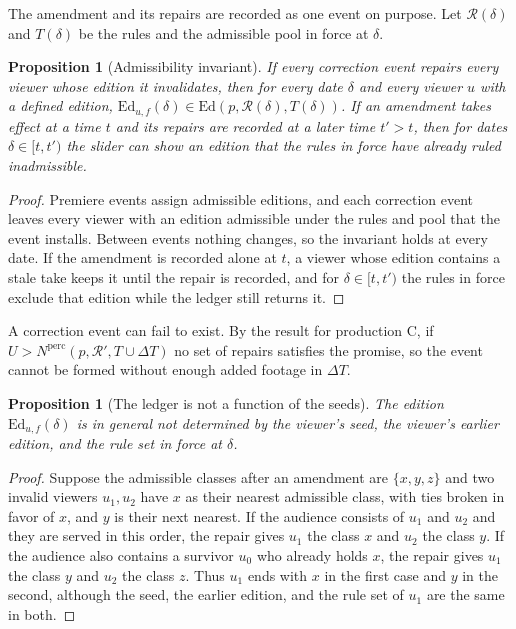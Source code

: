 \documentclass[11pt,twoside,openright]{book}
\theoremstyle{plain}
\newtheorem{proposition}[theorem]{Proposition}
\theoremstyle{definition}
\theoremstyle{remark}
\newcommand{\Ed}{\mathrm{Ed}}       %
\begin{document}
The amendment and its repairs are recorded as one event on purpose. Let $\mathcal R(\delta)$ and $T(\delta)$ be the rules and the admissible pool in force at $\delta$.

\begin{proposition}[Admissibility invariant]\label{prop:invariant}
If every correction event repairs every viewer whose edition it invalidates, then for every date $\delta$ and every viewer $u$ with a defined edition, $\mathrm{Ed}_{u,f}(\delta)\in\Ed(p,\mathcal R(\delta),T(\delta))$. If an amendment takes effect at a time $t$ and its repairs are recorded at a later time $t'>t$, then for dates $\delta\in[t,t')$ the slider can show an edition that the rules in force have already ruled inadmissible.
\end{proposition}

\begin{proof}
Premiere events assign admissible editions, and each correction event leaves every viewer with an edition admissible under the rules and pool that the event installs. Between events nothing changes, so the invariant holds at every date. If the amendment is recorded alone at $t$, a viewer whose edition contains a stale take keeps it until the repair is recorded, and for $\delta\in[t,t')$ the rules in force exclude that edition while the ledger still returns it.
\end{proof}

A correction event can fail to exist. By the result for production C, if $U>N^{\mathrm{perc}}(p,\mathcal R',T\cup\Delta T)$ no set of repairs satisfies the promise, so the event cannot be formed without enough added footage in $\Delta T$.

\begin{proposition}[The ledger is not a function of the seeds]\label{prop:ledger}
The edition $\mathrm{Ed}_{u,f}(\delta)$ is in general not determined by the viewer's seed, the viewer's earlier edition, and the rule set in force at $\delta$.
\end{proposition}

\begin{proof}
Suppose the admissible classes after an amendment are $\{x,y,z\}$ and two invalid viewers $u_1,u_2$ have $x$ as their nearest admissible class, with ties broken in favor of $x$, and $y$ is their next nearest. If the audience consists of $u_1$ and $u_2$ and they are served in this order, the repair gives $u_1$ the class $x$ and $u_2$ the class $y$. If the audience also contains a survivor $u_0$ who already holds $x$, the repair gives $u_1$ the class $y$ and $u_2$ the class $z$. Thus $u_1$ ends with $x$ in the first case and $y$ in the second, although the seed, the earlier edition, and the rule set of $u_1$ are the same in both.
\end{proof}
\end{document}
